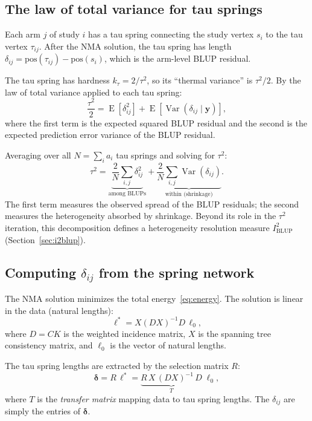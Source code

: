 \documentclass[12pt]{article}
\newcommand{\Var}{\operatorname{Var}}
\newcommand{\E}{\operatorname{E}}
\begin{document}
\subsection{The law of total variance for tau springs}

Each arm $j$ of study $i$ has a tau spring connecting the study vertex
$s_i$ to the tau vertex $\tau_{ij}$.  After the NMA solution, the tau
spring has length $\delta_{ij} = \text{pos}(\tau_{ij}) - \text{pos}(s_i)$,
which is the arm-level BLUP residual.

The tau spring has hardness $k_\tau = 2/\tau^2$, so its ``thermal
variance'' is $\tau^2/2$.  By the law of total variance applied to each
tau spring:
\begin{equation}\label{eq:lotv}
  \frac{\tau^2}{2} = \E[\delta_{ij}^2] + \E[\Var(\delta_{ij} \mid \mathbf{y})],
\end{equation}
where the first term is the expected squared BLUP residual and the
second is the expected prediction error variance of the BLUP residual.

Averaging over all $N = \sum_i a_i$ tau springs and solving for $\tau^2$:
\begin{equation}\label{eq:springreml}
  \tau^2 = \underbrace{\frac{2}{N} \sum_{i,j} \delta_{ij}^2}_{\text{among BLUPs}}
         + \underbrace{\frac{2}{N} \sum_{i,j} \Var(\delta_{ij})}_{\text{within (shrinkage)}}.
\end{equation}
The first term measures the observed spread of the BLUP residuals; the
second measures the heterogeneity absorbed by shrinkage.  Beyond its
role in the $\tau^2$ iteration, this decomposition defines a
heterogeneity resolution measure $I^2_{\mathrm{BLUP}}$ (Section~\ref{sec:i2blup}).

\subsection{Computing $\delta_{ij}$ from the spring network}

The NMA solution minimizes the total energy~\eqref{eq:energy}.  The
solution is linear in the data (natural lengths):
\begin{equation}
  \boldsymbol{\ell}^* = X (DX)^{-1} D \, \boldsymbol{\ell}_0,
\end{equation}
where $D = CK$ is the weighted incidence matrix, $X$ is the spanning
tree consistency matrix, and $\boldsymbol{\ell}_0$ is the vector of
natural lengths.

The tau spring lengths are extracted by the selection matrix $R$:
\begin{equation}\label{eq:transfer}
  \boldsymbol{\delta} = R \, \boldsymbol{\ell}^*
    = \underbrace{R \, X \, (DX)^{-1} \, D}_{T} \; \boldsymbol{\ell}_0,
\end{equation}
where $T$ is the \emph{transfer matrix} mapping data to tau spring
lengths.  The $\delta_{ij}$ are simply the entries of
$\boldsymbol{\delta}$.
\end{document}

